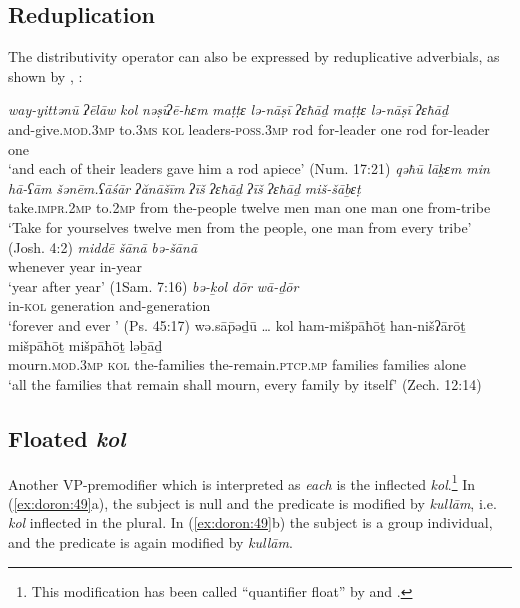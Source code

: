 \documentclass[output=paper]{langsci/langscibook}
\begin{document}
\subsection{Reduplication}%
The distributivity operator can also be expressed by reduplicative adverbials, as shown by \citet{BeckStechow2006}, \citet{NaudeMillerNaude2015}:

\ea%
    \label{ex:doron:48}
    \ea
    \gll \textit{way-yittənū}             \textit{ʔēlāw}   \textit{kol}  \textit{nəṣīʔē-hɛm}           \textit{maṭṭɛ} \textit{lə-nāṣī}      \textit{ʔɛħāḏ} \textit{maṭṭɛ} \textit{lə-nāṣī}    \textit{ʔɛħāḏ}\\
         and-give.\textsc{mod.3mp}  to.\textsc{3ms}  \textsc{kol} leaders-\textsc{poss.3mp} rod  for-leader one    rod   for-leader one\\
    \glt `and each of their leaders gave him a rod apiece' (Num. 17:21)
    \ex
    \gll \textit{qəħū}                  \textit{lāḵɛm}  \textit{min}   \textit{hā-ʕām}      \textit{šənēm.ʕāśār} \textit{ʔănāšīm} \textit{ʔīš}    \textit{ʔɛħāḏ}  \textit{ʔīš}    \textit{ʔɛħāḏ}  \textit{miš-šāḇɛṭ}\\
         take.\textsc{impr.2mp}  to.2\textsc{mp} from the-people twelve           men       man one      man one    from-tribe\\
    \glt `Take for yourselves twelve men from the people, one man from every tribe' (Josh. 4:2)
    \ex
    \gll \textit{middē}       \textit{šānā}  \textit{bə-šānā}\\
         whenever year  in-year \\
    \glt `year after year' (1Sam. 7:16)
    \ex
    \gll \textit{bə-ḵol}  \textit{dōr}             \textit{wā-ḏōr}\\
         in-\textsc{kol} generation and-generation     \\
    \glt `forever and ever ' (Ps. 45:17)
    \ex
    \gll wə.sā\={p}əḏū …       kol  ham-mišpāħōṯ  han-nišʔārōṯ             mišpāħōṯ mišpāħōṯ ləḇāḏ\\
         mourn.\textsc{mod.3mp} {}  \textsc{kol} the-families     the-remain.\textsc{ptcp.mp}  families families   alone   \\
    \glt `all the families that remain shall mourn, every family by itself' (Zech. 12:14)
    \z
\z

\subsection{Floated \textit{kol}}%
Another VP-premodifier which is interpreted as \textit{each} is the inflected \textit{kol}.\footnote{This modification has been called “quantifier float” by \citet{Shlonsky1991} and \cite{Naudé2011Syntactic}.} In (\ref{ex:doron:49}a), the subject is null and the predicate is modified by \textit{kullām}, i.e. \textit{kol} inflected in the plural. In (\ref{ex:doron:49}b) the subject is a group individual, and the predicate is again modified by \textit{kullām}.
\end{document}
